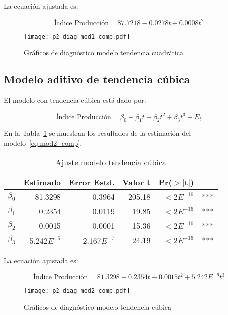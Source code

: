 \documentclass{tufte-handout}
\begin{document}
La ecuación ajustada es:

\begin{equation}
	\text{Índice Producción} = 87.7218 -0.0278 t + 0.0008 t^2
\end{equation}

\begin{figure*}[!ht]
    \texttt{[image: p2\_diag\_mod1\_comp.pdf]}
    \caption{Gráficos de diagnóstico modelo tendencia cuadrática}
    \label{fig:p2_diag_mod1_comp.pdf}
\end{figure*}

\subsection*{Modelo aditivo de tendencia cúbica}

El modelo con tendencia cúbica está dado por:

\begin{equation} \label{eq:mod2_comp}
	\text{Índice Producción} = \beta_0 + \beta_1 t + \beta_2 t^2 + \beta_3 t^3 + E_t
\end{equation}

En la Tabla~\ref{tab:mod2_comp} se muestran los resultados de la estimación del modelo~\ref{eq:mod2_comp}.

\begin{table}[ht]
\centering
\begin{tabular}{lrrrrl}
          & Estimado & Error Estd. & Valor t & Pr($>$$|$t$|$) & \\ 
  \hline
$\beta_0$ & 81.3298 & 0.3964 & 205.18 & $<2E^{-16}$ & *** \\ 
  $\beta_1$ & 0.2354 & 0.0119 & 19.85 & $<2E^{-16}$ & *** \\ 
  $\beta_2$ & -0.0015 & 0.0001 & -15.36 & $<2E^{-16}$ & *** \\ 
  $\beta_3$ & $5.242E^{-6}$ & $2.167E^{-7}$ & 24.19 & $<2E^{-16}$ & *** \\ 
   \hline
\end{tabular}
\caption{Ajuste modelo tendencia cúbica} 
\label{tab:mod2_comp}
\end{table}

La ecuación ajustada es:

\begin{equation}
	\text{Índice Producción} = 81.3298 + 0.2354 t - 0.0015 t^2 + 5.242E^{-6} t^3
\end{equation}

\begin{figure*}[!ht]
    \texttt{[image: p2\_diag\_mod2\_comp.pdf]}
    \caption{Gráficos de diagnóstico modelo tendencia cúbica}
    \label{fig:p2_diag_mod2_comp.pdf}
\end{figure*}
\end{document}
